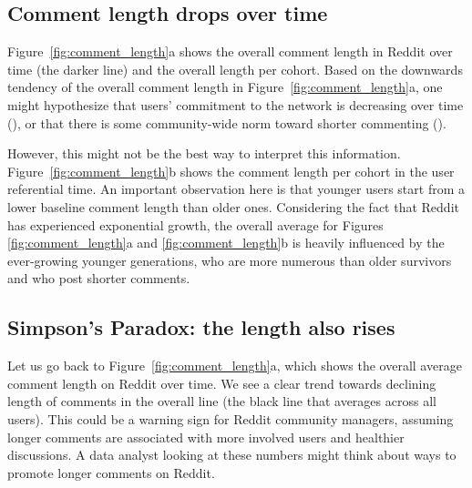 \subsection{Comment length drops over time}

Figure~\ref{fig:comment_length}a shows the overall comment length in Reddit over time (the darker line) and the overall length per cohort. 
Based on the downwards tendency of the overall comment length in Figure~\ref{fig:comment_length}a, one might hypothesize that users' commitment to the network is decreasing over time (\Hypothesis\label{hyp:decreasingCommitment}), or that there is some community-wide norm toward shorter commenting (\Hypothesis\label{hyp:communityNorm}). 

However, this might not be the best way to interpret this information. Figure~\ref{fig:comment_length}b shows the comment length per cohort in the user referential time. An important observation here is that younger users start from a lower baseline comment length than older ones. Considering the fact that Reddit has experienced exponential growth, the overall average for Figures \ref{fig:comment_length}a and \ref{fig:comment_length}b is heavily influenced by the ever-growing younger generations, who are more numerous than older survivors and who post shorter comments. 

\subsection{Simpson's Paradox: the length also rises}

Let us go back to Figure~\ref{fig:comment_length}a, which shows the overall average comment length on Reddit over time. We see a clear trend towards declining length of comments in the overall line (the black line that averages across all users). This could be a warning sign for Reddit community managers, assuming longer comments are associated with more involved users and healthier discussions. A data analyst looking at these numbers might think about ways to promote longer comments on Reddit. 

